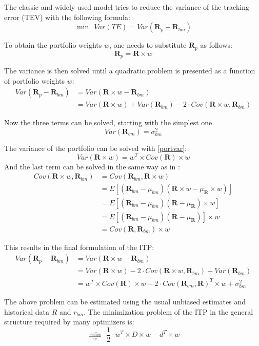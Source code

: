 \documentclass[
  oneside]{book}
\begin{document}
The classic and widely used model tries to reduce the variance of the tracking error (TEV) with the following formula:
\[
 \min \ \ Var(TE) = Var(\pmb{R}_{p}-\pmb{R}_{bm})
\]

To obtain the portfolio weights \(w\), one needs to substitute \(\pmb{R}_{p}\) as follows:
\[
  \pmb{R}_{p} = \pmb{R} \times w
\]

The variance is then solved until a quadratic problem is presented as a function of portfolio weights \(w\):
\begin{align*}
 Var(\pmb{R}_{p}-\pmb{R}_{bm}) &= Var(\pmb{R} \times w - \pmb{R}_{bm}) \\
 &= Var(\pmb{R} \times w) + Var(\pmb{R}_{bm}) - 2 \cdot Cov(\pmb{R} \times w,\pmb{R}_{bm}) 
\end{align*}

Now the three terms can be solved, starting with the simplest one.
\[
Var(\pmb{R}_{bm}) = \sigma_{bm}^2
\]

The variance of the portfolio can be solved with \ref{portvar}:
\[
Var(\pmb{R} \times w) = w^T \times Cov(\pmb{R}) \times w
\]
And the last term can be solved in the same way as in \citep{Eric2021}:
\begin{align*}
  Cov(\pmb{R} \times w, \pmb{R}_{bm}) &= Cov(\pmb{R}_{bm}, \pmb{R} \times w) \\
  &= E[(\pmb{R}_{bm}-\mu_{bm})(\pmb{R} \times w-\mu_{\pmb{R}} \times w)] \\
  &= E[(\pmb{R}_{bm}-\mu_{bm})(\pmb{R}-\mu_{\pmb{R}}) \times w] \\
  &= E[(\pmb{R}_{bm}-\mu_{bm})(\pmb{R}-\mu_{\pmb{R}})] \times w \\
  &= Cov(\pmb{R},\pmb{R}_{bm}) \times w
\end{align*}

This results in the final formulation of the ITP:
\begin{align*}
  Var(\pmb{R}_{p}-\pmb{R}_{bm}) & = Var(\pmb{R} \times w - \pmb{R}_{bm}) \\
  & = Var(\pmb{R} \times w) - 2 \cdot Cov(\pmb{R} \times w,\pmb{R}_{bm}) + Var(\pmb{R}_{bm})  \\
  & = w^T \times Cov(\pmb{R}) \times w - 2 \cdot Cov(\pmb{R}_{bm}, \pmb{R})^T \times w + \sigma_{bm}^2
  \label{eq:ITP}
\end{align*}

The above problem can be estimated using the usual unbiased estimates and historical data \(R\) and \(r_{bm}\). The minimization problem of the ITP in the general structure required by many optimizers is:
\[
  \min\limits_{w} \ \ \frac{1}{2} \cdot w^T \times D \times w -d^T \times w
\]
\end{document}
